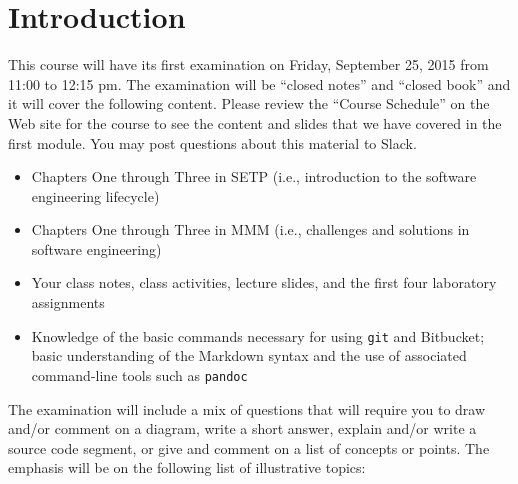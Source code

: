 


\section*{Introduction}

This course will have its first examination on Friday, September 25, 2015 from 11:00 to 12:15 pm. The examination will
be ``closed notes'' and ``closed book'' and it will cover the following content. Please review the ``Course Schedule''
on the Web site for the course to see the content and slides that we have covered in the first module. You may post
questions about this material to Slack.

\begin{itemize}

  \itemsep 0in

  \item Chapters One through Three in SETP (i.e., introduction to the software engineering lifecycle)

  \item Chapters One through Three in MMM (i.e., challenges and solutions in software engineering)

  \item Your class notes, class activities, lecture slides, and the first four laboratory assignments

  \item Knowledge of the basic commands necessary for using {\tt git} and Bitbucket; basic understanding of the Markdown
    syntax and the use of associated command-line tools such as {\tt pandoc}

\end{itemize}

\vspace*{-.05in}

\noindent The examination will include a mix of questions that will require you to draw and/or comment on a diagram,
write a short answer, explain and/or write a source code segment, or give and comment on a list of concepts or points.
The emphasis will be on the following list of illustrative topics:

